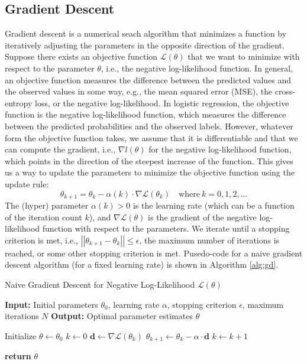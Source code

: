 \documentclass{article}[12pt]
\newcommand{\norm}[1]{\left|\left|#1\right|\right|}
\begin{document}
\subsection{Gradient Descent}
Gradient descent is a numerical seach algorithm that minimizes a function by iteratively adjusting the parameters in the opposite direction of the gradient.
Suppose there exists an objective function $\mathcal{L}(\theta)$ that we want to minimize with respect to the parameter $\theta$, i.e., the negative log-likelihood function.
In general, an objective function measures the difference between the predicted values and the observed values in some way, e.g., the mean squared error (MSE), the cross-entropy loss, or the negative log-likelihood.
In logistic regression, the objective function is the negative log-likelihood function, which measures the difference between the predicted probabilities and the observed labels. However, whatever form the objective function takes, we assume that it is differentiable and that we can compute the gradient, i.e., $\nabla{l}(\theta)$ for the negative log-likelihood function, 
which points in the direction of the steepest increase of the function. This gives us a way to update the parameters to minimize the objective function using the update rule:
\begin{equation*}
\theta_{k+1} = \theta_{k} - \alpha(k)\cdot\nabla\mathcal{L}(\theta_{k})\quad\text{where}{~k = 0,1,2,\dots}
\end{equation*}
The (hyper) parameter $\alpha(k)>0$ is the learning rate (which can be a function of the iteration count $k$), and $\nabla\mathcal{L}(\theta)$ is the gradient of the negative log-likelihood function with respect to the parameters.  
We iterate until a stopping criterion is met, i.e., $\norm{\theta_{k+1} - \theta_{k}}\leq\epsilon$, the maximum number of iterations is reached, or some other stopping criterion is met.
Pusedo-code for a naive gradient descent algorithm (for a fixed learning rate) is shown in Algorithm \ref{alg:gd}.


\begin{algorithm}[H]
\caption{Naive Gradient Descent for Negative Log-Likelihood $\mathcal{L}(\theta)$}\label{alg:gd}
\begin{algorithmic}[1]
\State \textbf{Input:} Initial parameters $\theta_0$, learning rate $\alpha$, stopping criterion $\epsilon$, maximum iterations $N$
\State \textbf{Output:} Optimal parameter estimates $\theta$

\State Initialize $\theta \gets \theta_0$
\State $k \gets 0$
    \State $\mathbf{d} \gets \nabla \mathcal{L}(\theta_{k})$
    \State $\theta_{k+1} \gets \theta_{k} - \alpha \cdot \mathbf{d}$
    \State $k \gets k + 1$
\EndWhile

\State \textbf{return} $\theta$
\end{algorithmic}
\end{algorithm}
\end{document}
